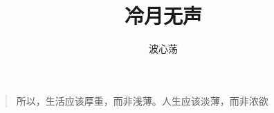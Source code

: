 \documentclass[10pt, b5paper,oneside]{book}
\begin{document}
\frontmatter
\renewcommand\contentsname{目录}
\title{冷月无声}
\author{波心荡}

\clearpage\maketitle
\thispagestyle{empty}

\vspace*{\fill} 
\begin{quote} 
\centering 
所以，生活应该厚重，而非浅薄。人生应该淡薄，而非浓欲
\end{quote}
\vspace*{\fill}


\tableofcontents
\mainmatter









\end{document}
